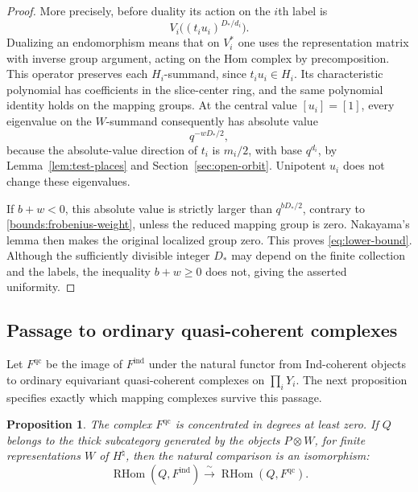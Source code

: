 \documentclass[11pt]{article}
\numberwithin{equation}{section}
\newtheorem{proposition}[theorem]{Proposition}
\theoremstyle{definition}
\theoremstyle{remark}
\newcommand{\RHom}{\operatorname{RHom}}
\begin{document}
\begin{proof}
More precisely, before duality its action on the $i$th label is
\begin{equation}
 V_i\bigl((t_iu_i)^{D_*/d_i}\bigr).
 \label{bounds:matrix-frobenius}
\end{equation}
Dualizing an endomorphism means that on $V_i^*$ one uses the
representation matrix with inverse group argument, acting on the
Hom complex by precomposition.  This operator preserves each
$H_i$-summand, since $t_iu_i\in H_i$.  Its characteristic polynomial
has coefficients in the slice-center ring, and the same polynomial
identity holds on the mapping groups.  At the central value
$[u_i]=[1]$, every eigenvalue on the $W$-summand consequently has
absolute value
\[
 q^{-wD_*/2},
\]
because the absolute-value direction of $t_i$ is $m_i/2$, with
base $q^{d_i}$, by Lemma~\ref{lem:test-places} and
Section~\ref{sec:open-orbit}.  Unipotent $u_i$ does not change these
eigenvalues.

If $b+w<0$, this absolute value is strictly larger than
$q^{bD_*/2}$, contrary to \eqref{bounds:frobenius-weight}, unless
the reduced mapping group is zero.  Nakayama's lemma then makes
the original localized group zero.  This proves
\eqref{eq:lower-bound}.  Although the sufficiently divisible integer
$D_*$ may depend on the finite collection and the labels, the
inequality $b+w\geq0$ does not, giving the asserted uniformity.
\end{proof}

\subsection{Passage to ordinary quasi-coherent complexes}

Let $F^{\mathrm{qc}}$ be the image of $F^{\mathrm{ind}}$ under the
natural functor from Ind-coherent objects to ordinary equivariant
quasi-coherent complexes on $\prod_iY_i$.  The next proposition
specifies exactly which mapping complexes survive this passage.

\begin{proposition}\label{prop:ind-qc-comparison}
The complex $F^{\mathrm{qc}}$ is concentrated in degrees at least
zero.  If $Q$ belongs to the thick subcategory generated by the
objects $P\otimes W$, for finite representations $W$ of
$H^\natural$, then the natural comparison is an isomorphism:
\begin{equation}
 \RHom(Q,F^{\mathrm{ind}})
   \xrightarrow{\ \sim\ }\RHom(Q,F^{\mathrm{qc}}).
 \label{eq:ind-qc-comparison}
\end{equation}
\end{proposition}
\end{document}
